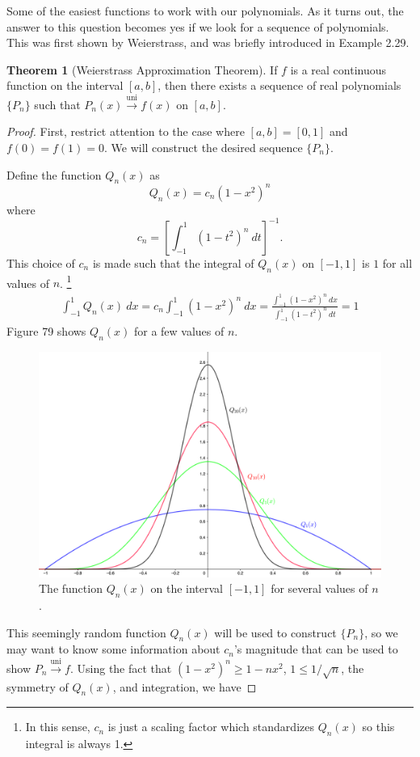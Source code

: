 \documentclass{article}
\newcommand{\uni}{\overset{\text{uni}}{\to}}
\theoremstyle{definition}
\newtheorem{theorem}{Theorem}[section]
\begin{document}
	Some of the easiest functions to work with our polynomials. As it turns out, the answer to this question becomes yes if we look for a sequence of polynomials. This was first shown by Weierstrass, and was briefly introduced in Example 2.29. 
	\begin{theorem}[Weierstrass Approximation Theorem]
		If $ f $ is a real continuous function on the interval $ [a,b] $, then there exists a sequence of real polynomials $ \{P_n\} $ such that $ P_n(x)\uni f(x) $ on $ [a,b] $. 
	\end{theorem}
	\begin{proof}
		First, restrict attention to the case where $ [a,b]=[0,1] $ and $ f(0)=f(1)=0 $. We will construct the desired sequence $ \{P_n\} $. 
		
		Define the function $ Q_n(x) $ as $$Q_n(x)=c_n(1-x^2)^n $$ where $$ c_n=\left[\int_{-1}^{1} (1-t^2)^n\ dt\right]^{-1}.$$ This choice of $ c_n $ is made such that the integral of $ Q_n(x) $ on $ [-1,1] $ is $ 1 $ for all values of $ n $. \footnote{In this sense, $ c_n $ is just a scaling factor which standardizes $ Q_n(x) $ so this integral is always 1.}
		\begin{align}
			\int_{-1}^{1}Q_n(x)\ dx=c_n\int_{-1}^{1}(1-x^2)^n\ dx=\frac{\int_{-1}^{1} (1-x^2)^n\ dx}{\int_{-1}^{1} (1-t^2)^n\ dt}=1
		\end{align}
		Figure 79 shows $ Q_n(x) $ for a few values of $ n $. 
		\begin{figure}[h!]
			\centering
			\includegraphics[width=0.9\linewidth]{figures/landau_kern}
			\caption{The function $ Q_n(x) $ on the interval $ [-1,1] $ for several values of $ n $.}
			\label{fig:landaukern}
		\end{figure}
		This seemingly random function $ Q_n(x) $ will be used to construct $ \{P_n\} $, so we may want to know some information about $c_n$'s magnitude that can be used to show $ P_n\uni f $. Using the fact that $ (1-x^2)^n\ge1-nx^2 $, $ 1\le 1/\sqrt{n} $, the symmetry of $ Q_n(x) $, and integration, we have 

\end{proof}
\end{document}
